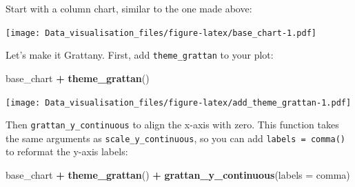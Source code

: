 \documentclass[]{book}
\newenvironment{Shaded}{\begin{snugshade}}{\end{snugshade}}
\newcommand{\DataTypeTok}[1]{\textcolor[rgb]{0.13,0.29,0.53}{#1}}
\newcommand{\KeywordTok}[1]{\textcolor[rgb]{0.13,0.29,0.53}{\textbf{#1}}}
\newcommand{\NormalTok}[1]{#1}
\newcommand{\OperatorTok}[1]{\textcolor[rgb]{0.81,0.36,0.00}{\textbf{#1}}}
\newcommand{\StringTok}[1]{\textcolor[rgb]{0.31,0.60,0.02}{#1}}
\begin{document}
Start with a column chart, similar to the one made above:

\begin{Shaded}
\end{Shaded}

\texttt{[image: Data\_visualisation\_files/figure-latex/base\_chart-1.pdf]}

Let's make it Grattany. First, add \texttt{theme\_grattan} to your plot:

\begin{Shaded}
\begin{Highlighting}[]
\NormalTok{base_chart }\OperatorTok{+}
\StringTok{        }\KeywordTok{theme_grattan}\NormalTok{()}
\end{Highlighting}
\end{Shaded}

\texttt{[image: Data\_visualisation\_files/figure-latex/add\_theme\_grattan-1.pdf]}

Then \texttt{grattan\_y\_continuous} to align the x-axis with zero. This function takes the same arguments as \texttt{scale\_y\_continuous}, so you can add \texttt{labels\ =\ comma()} to reformat the y-axis labels:

\begin{Shaded}
\begin{Highlighting}[]
\NormalTok{base_chart }\OperatorTok{+}
\StringTok{        }\KeywordTok{theme_grattan}\NormalTok{() }\OperatorTok{+}
\StringTok{        }\KeywordTok{grattan_y_continuous}\NormalTok{(}\DataTypeTok{labels =}\NormalTok{ comma)}
\end{Highlighting}
\end{Shaded}
\end{document}
